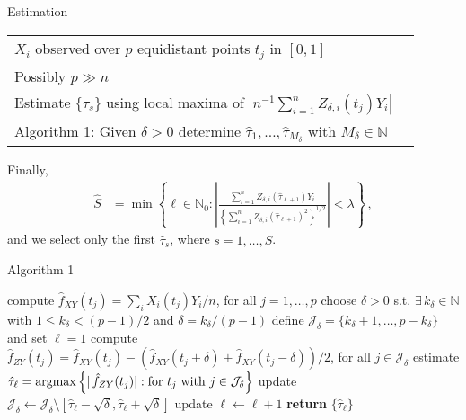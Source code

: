 \begin{frame}{Estimation}
    \vspace{-1cm}
    \begin{table}[]
    \renewcommand{\arraystretch}{2}
        \begin{tabular}{ll}
           $X_i$ observed over $p$ equidistant points $t_j$ in $[0, 1]$\\
           Possibly $p \gg n$\\
           Estimate $\{\tau_s\}$ using local maxima of $|n^{-1} \sum_{i=1}^n
          Z_{\delta, i}(t_j) Y_i |$\\
           Algorithm 1: Given $\delta > 0$ determine $\hat{\tau}_1, \dots,
          \hat{\tau}_{M_{\delta}}$ with $M_{\delta} \in \mathbb{N}$
        \end{tabular}
    \end{table}

Finally,
\vspace{-0.8cm}
\begin{align*}
    \hat{S} &= \min \left\{\ell \in \mathbb{N}_0 : \left|\frac{\sum_{i = 1}^n Z_{\delta,
i}(\hat{\tau}_{\ell + 1}) Y_i}{\left\{\sum_{i=1}^n Z_{\delta, i} (\hat{\tau}_{\ell +
1})^2\right\}^{1/2}}
\right| < \lambda \right\} \,,
\end{align*}
and we select only the first $\hat{\tau}_s$, where $s = 1, \dots, \hat{S}$.

\end{frame}


\begin{frame}{Algorithm 1}

\vspace{-0.5cm}
\begin{algorithm}[H]
\begin{algorithmic}[1]
  \State compute $\hat{f}_{XY}(t_j) = \sum_i X_i(t_j) Y_i / n$, for all $j=1,\dots,p$
  \State choose $\delta > 0$ s.t. $\exists \, k_{\delta} \in \mathbb{N}$ with $1 \leq
  k_{\delta} < (p - 1)/2$ and $\delta = k_{\delta} / (p-1)$
  \State define $\mathcal{J}_{\delta} = \{k_{\delta} + 1, \dots, p - k_{\delta}\}$ and
  set $\ell = 1$
  \State compute $\hat{f}_{ZY}(t_j) = \hat{f}_{XY}(t_j) - (\hat{f}_{XY}(t_j + \delta) +
  \hat{f}_{XY}(t_j - \delta)) / 2$, for all $j \in \mathcal{J}_{\delta}$
  \State estimate $\hat{\tau}_{\ell} = \operatorname*{argmax} \left\{|\,\hat{f}_{ZY}(t_j)| : \text{for }
      t_j \text{ with } j \in \mathcal{J}_{\delta}\right\}$
    \State update $\mathcal{J}_{\delta} \leftarrow \mathcal{J}_{\delta} \setminus
    [\hat{\tau}_{\ell} - \sqrt{\delta}, \hat{\tau}_{\ell} + \sqrt{\delta}]$
    \State update $\ell \leftarrow \ell + 1$
  \EndWhile
  \State \textbf{return} $\{\hat{\tau}_{\ell}\}$
\end{algorithmic}
\end{algorithm}

\end{frame}


